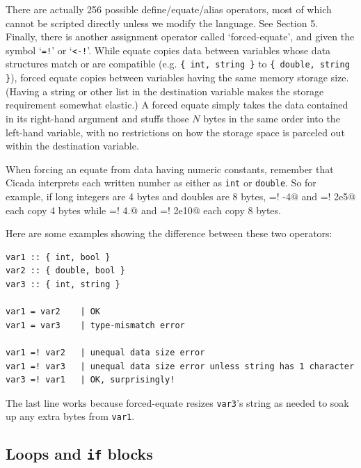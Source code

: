 \documentclass{article}
\newenvironment{code}{
       \begin{list}{}{
               \setlength{\leftmargin}{.4in}
               \setlength{\rightmargin}{0in}
               \setlength{\topsep}{.2in}
       }
       \small
       \item[] }
       { \end{list}   }
\begin{document}
There are actually 256 possible define/equate/alias operators, most of which cannot be scripted directly unless we modify the language.  See Section 5.\\

Finally, there is another assignment operator called `forced-equate', and given the symbol `\texttt{=!}' or `\verb#<-!#'.  While equate copies data between variables whose data structures match or are compatible (e.g. \verb#{ int, string }# to \verb#{ double, string }#), forced equate copies between variables having the same memory storage size.  (Having a string or other list in the destination variable makes the storage requirement somewhat elastic.)  A forced equate simply takes the data contained in its right-hand argument and stuffs those $N$ bytes in the same order into the left-hand variable, with no restrictions on how the storage space is parceled out within the destination variable.

When forcing an equate from data having numeric constants, remember that Cicada interprets each written number as either as \verb#int# or \verb#double#.  So for example, if long integers are 4 bytes and doubles are 8 bytes, \verb@a =! -4@ and \verb@a =! 2e5@ each copy 4 bytes while \verb@a =! 4.@ and \verb@a =! 2e10@ each copy 8 bytes.

Here are some examples showing the difference between these two operators:

\begin{code} \begin{verbatim}
var1 :: { int, bool }
var2 :: { double, bool }
var3 :: { int, string }

var1 = var2    | OK
var1 = var3    | type-mismatch error

var1 =! var2   | unequal data size error
var1 =! var3   | unequal data size error unless string has 1 character
var3 =! var1   | OK, surprisingly!
\end{verbatim} \end{code}

\noindent The last line works because forced-equate resizes \verb#var3#'s string as needed to soak up any extra bytes from \verb#var1#.






\subsection{Loops and \texttt{if} blocks} 
\end{document}
